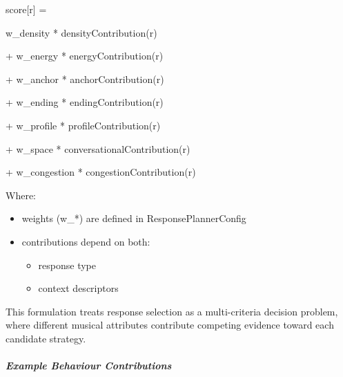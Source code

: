 score{[}r{]} =

w\_density * densityContribution(r)

+ w\_energy * energyContribution(r)

+ w\_anchor * anchorContribution(r)

+ w\_ending * endingContribution(r)

+ w\_profile * profileContribution(r)

+ w\_space * conversationalContribution(r)

+ w\_congestion * congestionContribution(r)

Where:

\begin{itemize}
\item
  weights (w\_*) are defined in ResponsePlannerConfig
\item
  contributions depend on both:

  \begin{itemize}
  \item
    response type
  \item
    context descriptors
  \end{itemize}
\end{itemize}

This formulation treats response selection as a multi-criteria decision
problem, where different musical attributes contribute competing
evidence toward each candidate strategy.

\subparagraph{Example Behaviour
Contributions}\label{example-behaviour-contributions}

